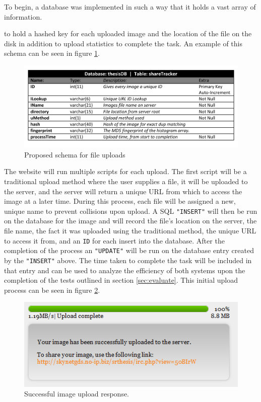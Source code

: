 To begin, a database was implemented in such a way that it holds a vast array of information.


 to hold a hashed key for each uploaded image and the location of the file on the disk in addition to upload statistics to complete the task. An example of this schema can be seen in figure \ref{fig:schema}.

\begin{figure}[htbp]
\centering
\includegraphics[width=5in]{schema}
\caption{Proposed schema for file uploads}
\label{fig:schema}
\end{figure}

The website will run multiple scripts for each upload. The first script will be a traditional upload method where the user supplies a file, it will be uploaded to the server, and the server will return a unique URL from which to access the image at a later time. During this process, each file will be assigned a new, unique name to prevent collisions upon upload. A SQL {\tt "INSERT"} will then be run on the database for the image and will record the file's location on the server, the file name, the fact it was uploaded using the traditional method, the unique URL to access it from, and an {\tt ID} for each insert into the database. After the completion of the process an {\tt "UPDATE"} will be run on the database entry created by the {\tt "INSERT"} above. The time taken to complete the task will be included in that entry and can be used to analyze the efficiency of both systems upon the completion of the tests outlined in section \ref{sec:evaluate}. This initial upload process can be seen in figure \ref{success_duponly}.

\begin{figure}[htbp]
\centering
\includegraphics[width=5in]{success_duponly}
\caption{Successful image upload response.}
\label{success_duponly}
\end{figure}

